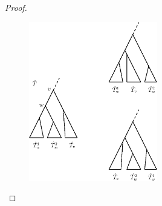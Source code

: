 \documentclass{amsart}
\begin{document}
\begin{proof}
    \begin{figure}[H]
    	\centering
    	\includegraphics[width=0.5\textwidth]{mrca_move}
        \vspace{2pt}
    	\caption{}
    	\label{fig:mrca_move}
    \end{figure}


\end{proof}
\end{document}
